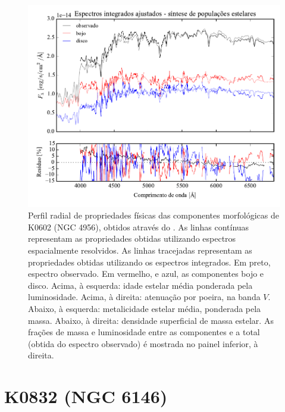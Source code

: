 \begin{figure}
	\includegraphics[page=8]{figuras/sample006a_synthesis}
	\caption[Propriedades físicas das componentes morfológicas de K0602 (NGC 4956)]
	{Perfil radial de propriedades físicas das componentes morfológicas de
	K0602 (NGC 4956), obtidos através do \starlight. As linhas contínuas
	representam as propriedades obtidas utilizando espectros espacialmente
	resolvidos. As linhas tracejadas representam as propriedades obtidas utilizando
	os espectros integrados. Em preto, espectro observado. Em vermelho, e azul, as
	componentes bojo e disco. Acima, à esquerda: idade estelar média ponderada pela
	luminosidade. Acima, à direita: atenuação por poeira, na banda $V$. Abaixo, à
	esquerda: metalicidade estelar média, ponderada pela massa. Abaixo, à direita:
	densidade superficial de massa estelar. As frações de massa e luminosidade
	entre as componentes e a total (obtida do espectro observado) é mostrada no
	painel inferior, à direita.}
	\label{fig:decompSinteseRadprof:K0602}
\end{figure}


\section{K0832 (NGC 6146)}
\label{apendice:Decomp:K0832}

